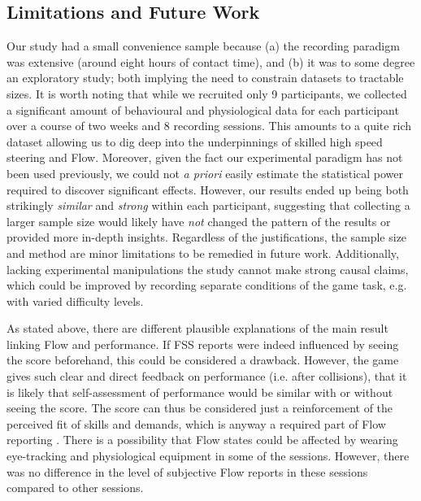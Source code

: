 \documentclass{frontierstyle/frontiersSCNS}
\newcommand{\hl}{\textcolor{red!80}}
\begin{document}
\subsection{Limitations and Future Work}
Our study had a small convenience sample because (a) the recording paradigm was extensive (around eight hours of contact time), and (b) it was to some degree an exploratory study; both implying the need to constrain datasets to tractable sizes. It is worth noting that while we recruited only 9 participants, we collected a significant amount of behavioural and physiological data for each participant over a course of two weeks and 8 recording sessions. This amounts to a quite rich dataset allowing us to dig deep into the underpinnings of skilled high speed steering and Flow. Moreover, given the fact our experimental paradigm has not been used previously, we could not {\it a priori} easily estimate the statistical power required to discover significant effects. However, our results ended up being both strikingly {\it similar} and {\it strong} within each participant, suggesting that collecting a larger sample size would likely have {\it not} changed the pattern of the results or provided more in-depth insights. Regardless of the justifications, the sample size and method are minor limitations to be remedied in future work. Additionally, lacking experimental manipulations the study cannot make strong causal claims, which could be improved by recording separate conditions of the game task, e.g. with varied difficulty levels.

As stated above, there are different plausible explanations of the main result linking Flow and performance. If FSS reports were indeed influenced by seeing the score beforehand, this could be considered a drawback. However, the game gives such clear and direct feedback on performance (i.e. after collisions), that it is likely that self-assessment of performance would be similar with or without seeing the score. The score can thus be considered just a reinforcement of the perceived fit of skills and demands, which is anyway a required part of Flow reporting \citep{Keller2012}. \hl{There is a possibility that Flow states could be affected by wearing eye-tracking and physiological equipment in some of the sessions. However, there was no difference in the level of subjective Flow reports in these sessions compared to other sessions.}
\end{document}
